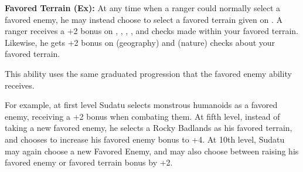 

\textbf{Favored Terrain (Ex):} At any time when a ranger could normally select a favored enemy, he may instead choose to select a favored terrain given on . A ranger receives a +2 bonus on , , , ,  and  checks made within your favored terrain. Likewise, he gets +2 bonus on  (geography) and  (nature) checks about your favored terrain.

This ability uses the same graduated progression that the favored enemy ability receives.

For example, at first level Sudatu selects monstrous humanoids as a favored enemy, receiving a +2 bonus when combating them. At fifth level, instead of taking a new favored enemy, he selects a Rocky Badlands as his favored terrain, and chooses to increase his favored enemy bonus to +4. At 10th level, Sudatu may again choose a new Favored Enemy, and may also choose between raising his favored enemy or favored terrain bonus by +2.

